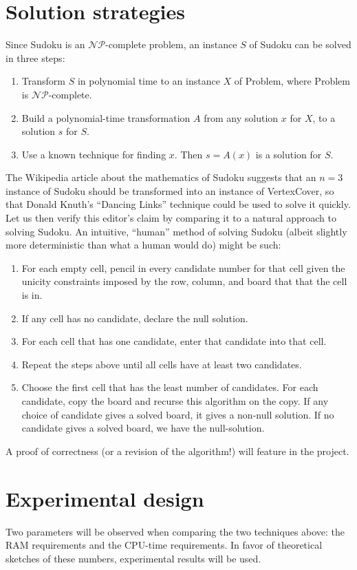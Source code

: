 \documentclass{article}
\begin{document}
\section{Solution strategies}
Since {\sc Sudoku} is an $\mathcal{NP}$-complete problem, an instance $S$ of {\sc Sudoku} can be solved in three steps:
\begin{enumerate}
\item Transform $S$ in polynomial time to an instance $X$ of {\sc Problem}, where {\sc Problem} is $\mathcal{NP}$-complete.
\item Build a polynomial-time transformation $A$ from any solution $x$ for $X$, to a solution $s$ for $S$.
\item Use a known technique for finding $x$. Then $s = A(x)$ is a solution for $S$.
\end{enumerate}
The Wikipedia article about the mathematics of Sudoku suggests that an $n=3$ instance of {\sc Sudoku} should be transformed into an instance of {\sc VertexCover}, so that Donald Knuth's ``Dancing Links'' technique could be used to solve it quickly. Let us then verify this editor's claim by comparing it to a natural approach to solving Sudoku. An intuitive, ``human'' method of solving Sudoku (albeit slightly more deterministic than what a human would do) might be such:
\begin{enumerate}
   \item For each empty cell, pencil in every candidate number for that cell given the unicity constraints imposed by the row, column, and board that that the cell is in.
   \item If any cell has no candidate, declare the null solution.
   \item For each cell that has one candidate, enter that candidate into that cell.
   \item Repeat the steps above until all cells have at least two candidates.
   \item Choose the first cell that has the least number of candidates. For each candidate, copy the board and recurse this algorithm on the copy. If any choice of candidate gives a solved board, it gives a non-null solution. If no candidate gives a solved board, we have the null-solution.
\end{enumerate}
A proof of correctness (or a revision of the algorithm!) will feature in the project.

\section{Experimental design}
Two parameters will be observed when comparing the two techniques above: the RAM requirements and the CPU-time requirements. In favor of theoretical sketches of these numbers, experimental results will be used.
\end{document}

